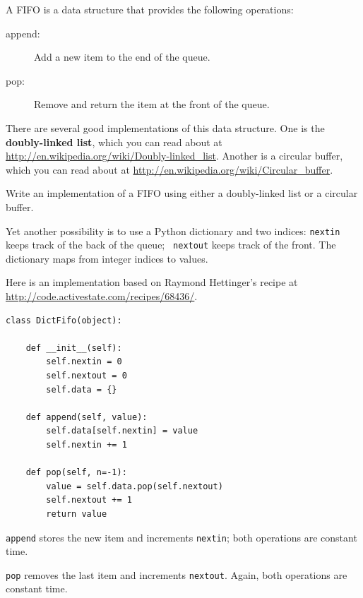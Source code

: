 \documentclass[10pt]{book}
\begin{document}
A FIFO is a data structure that provides the following operations:

\begin{description}

\item[append:] Add a new item to the end of the queue.

\item[pop:] Remove and return the item at the front of the queue.

\end{description}

There are several good implementations of this data structure.
One is the {\bf doubly-linked list}, which
you can read about at \url{http://en.wikipedia.org/wiki/Doubly-linked_list}.
Another is a circular buffer, which you can read about at
\url{http://en.wikipedia.org/wiki/Circular_buffer}.

\begin{exercise}

Write an implementation of a FIFO using either a doubly-linked
list or a circular buffer.

\end{exercise}

Yet another possibility is to use a Python dictionary and
two indices: {\tt nextin} keeps track of the back of the queue; {\tt
  nextout} keeps track of the front.  The dictionary maps from
integer indices to values.

Here is an implementation based on Raymond Hettinger's recipe
at \url{http://code.activestate.com/recipes/68436/}.

\begin{verbatim}
class DictFifo(object):

    def __init__(self):
        self.nextin = 0
        self.nextout = 0
        self.data = {}

    def append(self, value):
        self.data[self.nextin] = value
        self.nextin += 1

    def pop(self, n=-1):
        value = self.data.pop(self.nextout)
        self.nextout += 1
        return value
\end{verbatim}

{\tt append} stores the new item and increments {\tt nextin};
both operations are constant time.

{\tt pop} removes the last item and increments {\tt nextout}.  Again,
both operations are constant time.
\end{document}
